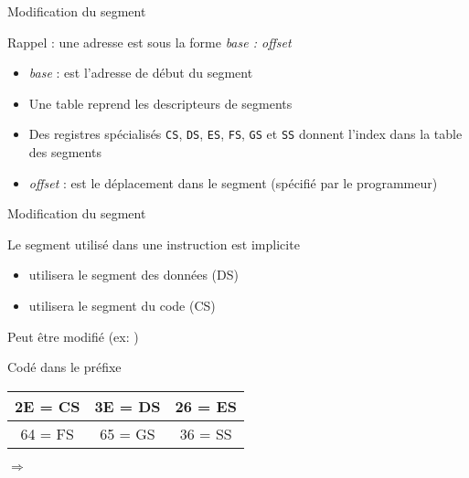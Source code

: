 \documentclass[14pt,xcolor,table]{beamer}
\begin{document}
\begin{frame}[fragile]{Modification du segment}

	Rappel : une adresse est sous la forme \emph{base : offset}

	\begin{itemize}
	\item \emph{base} : est l'adresse de début du segment
	\item Une table reprend les descripteurs de segments
	\item Des registres spécialisés 
		\verb_CS_, \verb_DS_, \verb_ES_, \verb_FS_, \verb_GS_ et \verb_SS_
		donnent l'index dans la table des segments
	\item \emph{offset} : est le déplacement dans le segment 
		(spécifié par le programmeur)
	\end{itemize}
	
\end{frame}

\begin{frame}[fragile]{Modification du segment}

	Le segment utilisé dans une instruction est implicite
	\begin{itemize}
		\item {} utilisera le segment des données (DS)
		\item {} utilisera le segment du code (CS)
	\end{itemize}
	
	\medskip
	Peut être modifié (ex: )

	\medskip
	Codé dans le préfixe
	\begin{center}
		\begin{tabular}{|c|c|c|} \hline
			2E = CS & 3E = DS & 26 = ES \\\hline
			64 = FS & 65 = GS & 36 = SS \\\hline  
		\end{tabular}
	\end{center}
	
	\medskip
	$\Rightarrow$ 
	  
	
\end{frame}
\end{document}
